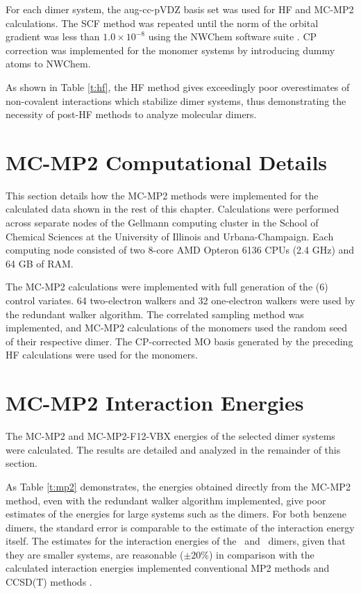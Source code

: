 For each dimer system, the aug-cc-pVDZ basis set \cite{dunning} was used for HF
and MC-MP2 calculations. The SCF method was repeated until the norm of the
orbital gradient was less than $1.0 \times 10^{-8}$ using the NWChem software
suite \cite{nwchem}. CP correction was implemented for the monomer systems by
introducing dummy atoms to NWChem.



As shown in Table \ref{t:hf}, the HF method gives exceedingly poor overestimates
of non-covalent interactions which stabilize dimer systems, thus demonstrating
the necessity of post-HF methods to analyze molecular dimers.

\section{MC-MP2 Computational Details}

This section details how the MC-MP2 methods were implemented for the calculated
data shown in the rest of this chapter. Calculations were performed across
separate nodes of the Gellmann computing cluster in the School of Chemical
Sciences at the University of Illinois and Urbana-Champaign. Each computing node
consisted of two 8-core AMD Opteron 6136 CPUs (2.4 GHz) and 64 GB of RAM.

The MC-MP2 calculations were implemented with full generation of the (6) control
variates. 64 two-electron walkers and 32 one-electron walkers were used by the
redundant walker algorithm. The correlated sampling method was implemented, and
MC-MP2 calculations of the monomers used the random seed of their respective
dimer. The CP-corrected MO basis generated by the preceding HF calculations were
used for the monomers.

\section{MC-MP2 Interaction Energies}

The MC-MP2 and MC-MP2-F12-VBX energies of the selected dimer systems were
calculated. The results are detailed and analyzed in the remainder of this
section.



As Table \ref{t:mp2} demonstrates, the energies obtained directly from the
MC-MP2 method, even with the redundant walker algorithm implemented, give poor
estimates of the energies for large systems such as the dimers. For both benzene
dimers, the standard error is comparable to the estimate of the interaction
energy itself. The estimates for the interaction energies of the \hho\ and \ch\
dimers, given that they are smaller systems, are reasonable ($\pm 20\%$) in
comparison with the calculated interaction energies implemented conventional MP2
methods and CCSD(T) methods \cite{s22-ccsdt}.

